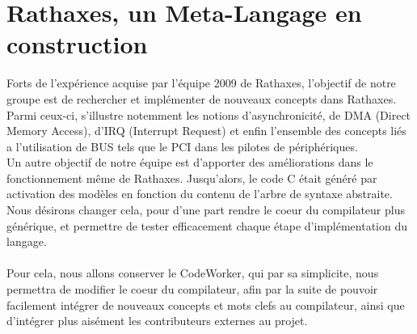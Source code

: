 \documentclass{rtxreport}
\begin{document}
\section{Rathaxes, un Meta-Langage en construction}

Forts de l'expérience acquise par l'équipe 2009 de Rathaxes, l'objectif de
notre groupe est de rechercher et implémenter de nouveaux concepts dans
Rathaxes. Parmi ceux-ci, s'illustre notemment les notions d'asynchronicité,
de DMA (Direct Memory Access), d'IRQ (Interrupt Request) et enfin l'ensemble
des concepts liés a l'utilisation de BUS tels que le PCI dans les pilotes de
périphériques.
\\
Un autre objectif de notre équipe est d'apporter des améliorations dans le
fonctionnement même de Rathaxes. Jusqu'alors, le code C était généré par
activation des modèles en fonction du contenu de l'arbre de syntaxe abstraite.
Nous désirons changer cela, pour d'une part rendre le coeur du compilateur
plus générique, et permettre de tester efficacement chaque étape
d'implémentation du langage.
\\
\\
Pour cela, nous allons conserver le CodeWorker, qui par sa simplicite, nous
permettra de modifier le coeur du compilateur, afin par la suite de pouvoir
facilement intégrer de nouveaux concepts et mots clefs au compilateur,
ainsi que d'intégrer plus aisément les contributeurs externes au projet.
\end{document}
